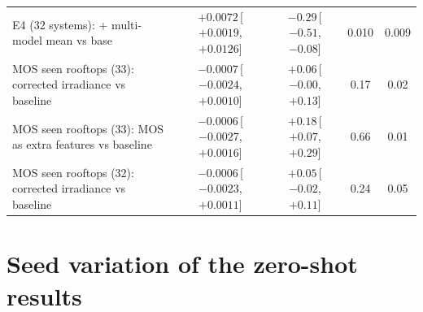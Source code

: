 \begin{table}[H]
\begin{tabularx}{\textwidth}{@{}X c c c c@{}}
E4 (32 systems): + multi-model mean vs base & $+0.0072$\,[$+0.0019$, $+0.0126$] & $-0.29$\,[$-0.51$, $-0.08$] & 0.010 & 0.009 \\
MOS seen rooftops (33): corrected irradiance vs baseline & $-0.0007$\,[$-0.0024$, $+0.0010$] & $+0.06$\,[$-0.00$, $+0.13$] & 0.17 & 0.02 \\
MOS seen rooftops (33): MOS as extra features vs baseline & $-0.0006$\,[$-0.0027$, $+0.0016$] & $+0.18$\,[$+0.07$, $+0.29$] & 0.66 & 0.01 \\
MOS seen rooftops (32): corrected irradiance vs baseline & $-0.0006$\,[$-0.0023$, $+0.0011$] & $+0.05$\,[$-0.02$, $+0.11$] & 0.24 & 0.05 \\
\bottomrule
\end{tabularx}
\end{table}

\section{Seed variation of the zero-shot results}
\label{sec:s-seeds}

